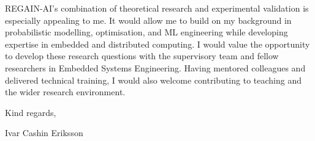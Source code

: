 \documentclass[11pt,a4paper]{moderncv}
\begin{document}
\vspace*{2em}
REGAIN-AI's combination of theoretical research and experimental validation is especially appealing to me. It would allow me to build on my background in probabilistic modelling, optimisation, and ML engineering while developing expertise in embedded and distributed computing. I would value the opportunity to develop these research questions with the supervisory team and fellow researchers in Embedded Systems Engineering. Having mentored colleagues and delivered technical training, I would also welcome contributing to teaching and the wider research environment.

\vspace{2em}
Kind regards,

Ivar Cashin Eriksson
\end{document}
